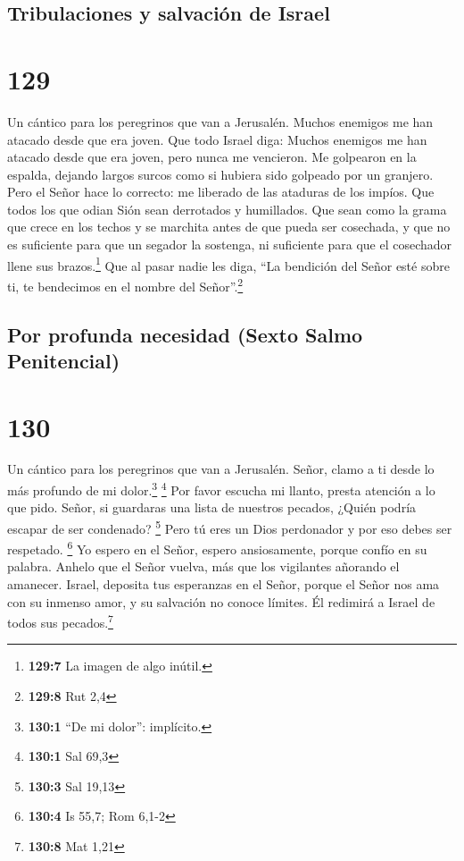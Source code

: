 \hypertarget{tribulaciones-y-salvaciuxf3n-de-israel}{%
\subsection{Tribulaciones y salvación de
Israel}\label{tribulaciones-y-salvaciuxf3n-de-israel}}

\hypertarget{section-128}{%
\section{129}\label{section-128}}

Un cántico para los peregrinos que van a Jerusalén. 
Muchos enemigos me han atacado desde que era joven. Que todo Israel
diga:  Muchos enemigos me han atacado desde que era joven,
pero nunca me vencieron.  Me golpearon en la espalda,
dejando largos surcos como si hubiera sido golpeado por un granjero.
 Pero el Señor hace lo correcto: me liberado de las
ataduras de los impíos.  Que todos los que odian Sión sean
derrotados y humillados.  Que sean como la grama que crece
en los techos y se marchita antes de que pueda ser cosechada,
 y que no es suficiente para que un segador la sostenga,
ni suficiente para que el cosechador llene sus brazos.\footnote{\textbf{129:7}
  La imagen de algo inútil.}  Que al pasar nadie les diga,
``La bendición del Señor esté sobre ti, te bendecimos en el nombre del
Señor''.\footnote{\textbf{129:8} Rut 2,4}

\hypertarget{por-profunda-necesidad-sexto-salmo-penitencial}{%
\subsection{Por profunda necesidad (Sexto Salmo
Penitencial)}\label{por-profunda-necesidad-sexto-salmo-penitencial}}

\hypertarget{section-129}{%
\section{130}\label{section-129}}

Un cántico para los peregrinos que van a Jerusalén. 
Señor, clamo a ti desde lo más profundo de mi dolor.\footnote{\textbf{130:1}
  ``De mi dolor'': implícito.} \footnote{\textbf{130:1} Sal 69,3}
 Por favor escucha mi llanto, presta atención a lo que
pido.  Señor, si guardaras una lista de nuestros pecados,
¿Quién podría escapar de ser condenado? \footnote{\textbf{130:3} Sal
  19,13}  Pero tú eres un Dios perdonador y por eso debes
ser respetado. \footnote{\textbf{130:4} Is 55,7; Rom 6,1-2}
 Yo espero en el Señor, espero ansiosamente, porque confío
en su palabra.  Anhelo que el Señor vuelva, más que los
vigilantes añorando el amanecer.  Israel, deposita tus
esperanzas en el Señor, porque el Señor nos ama con su inmenso amor, y
su salvación no conoce límites.  Él redimirá a Israel de
todos sus pecados.\footnote{\textbf{130:8} Mat 1,21}

